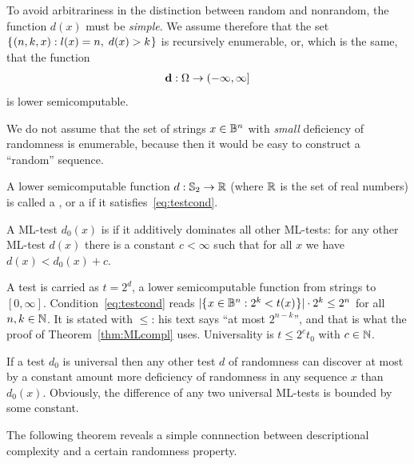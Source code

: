 To avoid arbitrariness in the distinction between random and
nonrandom, the function $d(x)$ must be \emph{simple}.
We assume
therefore that the set $\mathopen\{\mskip 1mu (n,k,x) : l(x) = n,\; d(x)>k \mskip 1mu\mathclose\}$ is
recursively enumerable, or, which is the same, that the function
 \begin{align*}
  \mathbf{d} : \Omega\to(-\infty,\infty]
 \end{align*}
is lower semicomputable.

 \begin{remark}
We do not assume that the set of strings $x \in \mathbb{B}^{n}$ with \emph{small}
deficiency of randomness is enumerable, because then it would be easy
to construct a ``random'' sequence.
 \end{remark}

\begin{definition}
  \label{def:g2.1.2}
  \leanok
A lower semicomputable function $d : \mathbb{S}_{2} \to \mathbb{R}$ (where $\mathbb{R}$ is the
set of real numbers) is called a , or a
 if it satisfies~\eqref{eq:testcond}.

A ML-test $d_{0}(x)$ is  if it additively dominates all
other ML-tests: for any other ML-test $d(x)$ there is a
constant $c<\infty$ such that for all $x$ we have
$d(x) < d_{0}(x) + c$.
\end{definition}

\begin{formalization}
A test is carried as \( t = 2^{d} \), a lower semicomputable function from strings to
\( [0,\infty] \). Condition~\eqref{eq:testcond} reads
\( |\mathopen\{\mskip 1mu x \in \mathbb{B}^{n} : 2^{k} < t(x)\mskip 1mu\mathclose\}| \cdot 2^{k} \le 2^{n} \) for all
\( n, k \in \mathbb{N} \). It is stated with \( \le \): his text says ``at most \( 2^{n-k} \)'', and
that is what the proof of Theorem~\ref{thm:MLcompl} uses. Universality is
\( t \le 2^{c} t_{0} \) with \( c \in \mathbb{N} \).
\end{formalization}

If a test $d_{0}$ is universal then any other test $d$ of randomness
can discover at most by a constant amount more deficiency of
randomness in any sequence $x$ than $d_{0}(x)$.
Obviously, the
difference of any two universal ML-tests is bounded by some
constant.

The following theorem reveals a simple connnection between descriptional
complexity and a certain randomness property.

